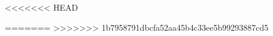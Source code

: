 \documentclass{report}
\begin{document}
\newpage
{}






\tableofcontents
\newpage

\listoffigures
\newpage
\listoftables
\newpage





<<<<<<< HEAD



=======
>>>>>>> 1b7958791dbcfa52aa45b4c33ee5b99293887cd5

\end{document}
